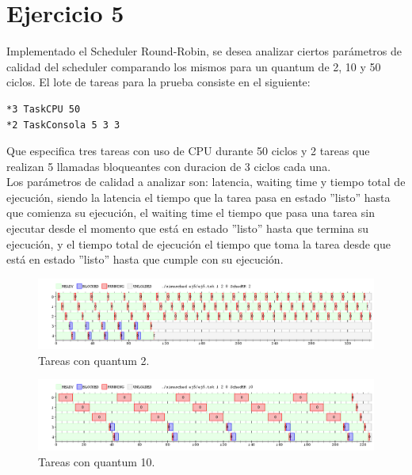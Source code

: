 \section{Ejercicio 5}

Implementado el Scheduler Round-Robin, se desea analizar ciertos parámetros de calidad del scheduler comparando los mismos para un quantum de 2, 10 y 50 ciclos.
El lote de tareas para la prueba consiste en el siguiente:

\begin{verbatim}
*3 TaskCPU 50 
*2 TaskConsola 5 3 3
\end{verbatim}

Que especifica tres tareas con uso de CPU durante 50 ciclos y 2 tareas que realizan 5 llamadas bloqueantes con duracion de 3 ciclos cada una.\\

Los parámetros de calidad a analizar son: latencia, waiting time y tiempo total de ejecución, siendo la latencia el tiempo que la tarea pasa en estado ''listo'' hasta que comienza su ejecución, el waiting time el tiempo que pasa una tarea sin ejecutar desde el momento que está en estado ''listo'' hasta que termina su ejecución, y el tiempo total de ejecución el tiempo que toma la tarea desde que está en estado ''listo'' hasta que cumple con su ejecución.

\begin{figure}[h]
  \includegraphics[width=\textwidth]{../ej5/ej5RR1202.png}
  \caption{Tareas con quantum 2.}
  \label{fig:quant2}
\end{figure}


\begin{figure}[h]
  \includegraphics[width=\textwidth]{../ej5/ej5RR12010.png}
  \caption{Tareas con quantum 10.}
\end{figure}


